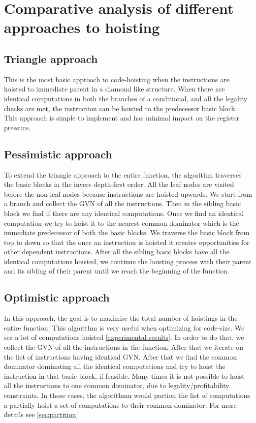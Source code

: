 \documentclass{sig-alternate}
\begin{document}
\section{Comparative analysis of different approaches to hoisting}
\subsection{Triangle approach}
This is the most basic approach to code-hoisting when the instructions are
hoisted to immediate parent in a diamond like structure. When there are
identical computations in both the branches of a conditional, and all the
legality checks are met, the instruction can be hoisted to the predecessor basic
block. This approach is simple to implement and has minimal impact on the
register pressure.

\subsection{Pessimistic approach}
To extend the triangle approach to the entire function, the algorithm traverses
the basic blocks in the invers depth-first order. All the leaf nodes are visited
before the non-leaf nodes because instructions are hoisted upwards. We start
from a branch and collect the GVN of all the instructions. Then in the sibling
basic block we find if there are any identical computations. Once we find an
identical computation we try to hoist it to the nearest common dominator which
is the immediate predecessor of both the basic blocks. We traverse the basic
block from top to down so that the once an instruction is hoisted it creates
opportunities for other dependent instructions. After all the sibling basic
blocks have all the identical computations hoisted, we continue the hoisting
process with their parent and its sibling of their parent until we reach the
beginning of the function.

\subsection{Optimistic approach}
In this approach, the goal is to maximise the total number of hoistings in the
entire function.  This algorithm is very useful when optimizing for code-size.
We see a lot of computations hoisted \ref{experimental-results}. In order to do
that, we collect the GVN of all the instructions in the function. After that we
iterate on the list of instructions having identical GVN. After that we find the
common dominator dominating all the identical computations and try to hoist the
instruction in that basic block, if feasible. Many times it is not possible to
hoist all the instructions to one common dominator, due to legality/profitability
constraints. In those cases, the algorithmn would partion the list of computations
a partially hoist a set of computations to their common dominator. For more details
see \ref{sec:partition}
\end{document}
